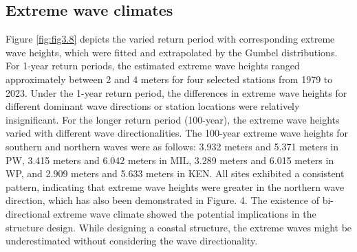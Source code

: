 \subsection{Extreme wave climates}
\label{c3_Extreme wave climates}

Figure \ref{fig:fig3.8} depicts the varied return period with corresponding extreme wave heights, which were fitted and extrapolated by the Gumbel distributions. For 1-year return periods, the estimated extreme wave heights ranged approximately between 2 and 4 meters for four selected stations from 1979 to 2023. Under the 1-year return period, the differences in extreme wave heights for different dominant wave directions or station locations were relatively insignificant. For the longer return period (100-year), the extreme wave heights varied with different wave directionalities. The 100-year extreme wave heights for southern and northern waves were as follows: 3.932 meters and 5.371 meters in PW, 3.415 meters and 6.042 meters in MIL, 3.289 meters and 6.015 meters in WP, and 2.909 meters and 5.633 meters in KEN. All sites exhibited a consistent pattern, indicating that extreme wave heights were greater in the northern wave direction, which has also been demonstrated in Figure. 4. The existence of bi-directional extreme wave climate showed the potential implications in the structure design. While designing a coastal structure, the extreme waves might be underestimated without considering the wave directionality.

